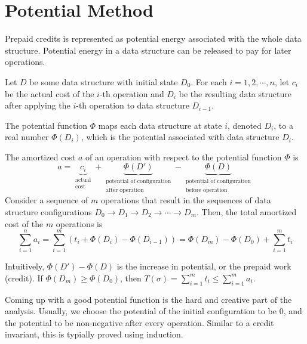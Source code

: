\section{Potential Method}

\vspace{\parskip}

Prepaid credits is represented as potential energy associated with the whole data structure. Potential energy in a data structure can be released to pay for later operations.

\begin{definition} 
    Let $D$ be some data structure with initial state $D_0$. For each $i = 1,2,\cdots,n$, let $c_i$ be the actual cost of the $i$-th operation and $D_i$ be the resulting data structure after applying the $i$-th operation to data structure $D_{i-1}$.

    The potential function $\Phi$ maps each data structure at state $i$, denoted $D_i$, to a real number $\Phi(D_i)$, which is the potential associated with data structure $D_i$.

    The amortized cost $a$ of an operation with respect to the potential function $\Phi$ is
    $$
    a = \underbrace{c_i}_{\substack{\text{actual} \\ \text{cost}}} + \underbrace{\Phi(D')}_{\substack{\text{potential of configuration} \\ \text{after operation}}} - \underbrace{\Phi(D)}_{\substack{\text{potential of configuration} \\ \text{before operation}}}
    $$
    Consider a sequence of $m$ operations that result in the sequences of data structure configurations $D_0 \to D_1 \to D_2 \to \cdots \to D_m$. Then, the total amortized cost of the $m$ operations is
    $$
    \sum_{i=1}^{n} a_i = \sum_{i=1}^{m} \left( t_i + \Phi(D_i) - \Phi(D_{i-1}) \right) = \Phi(D_m) - \Phi(D_0) + \sum_{i=1}^{m} t_i
    $$
\end{definition}
Intuitively, $\Phi(D')-\Phi(D)$ is the increase in potential, or the prepaid work (credit). If $\Phi(D_m) \geq \Phi(D_0)$, then $T(\sigma) = \sum_{i=1}^m t_i \leq \sum_{i=1}^m a_i$.

Coming up with a good potential function is the hard and creative part of the analysis. Usually, we choose the potential of the initial configuration to be 0, and the potential to be non-negative after every operation. Similar to a credit invariant, this is typially proved using induction.


